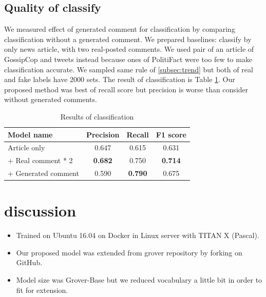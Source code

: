 \documentclass[conference]{IEEEtran}
\begin{document}
\subsection{Quality of classify}
We measured effect of generated comment for classification by comparing classification without a generated comment.
We prepared baselines: classify by only news article, with two real-posted comments.
We used pair of an article of GossipCop and tweets instead because ones of PolitiFact were too few to make classification accurate.
We sampled same rule of \ref{subsec:trend} but both of real and fake labels have 2000 sets.
The result of classification is Table \ref{fig:classify_results}.
Our proposed method was best of recall score but precision is worse than consider without generated comments.
\begin{table}[!t]
    \renewcommand{\arraystretch}{1.3}
    \caption{Results of classification}
    \label{fig:classify_results}
    \centering
    \begin{tabular}{lccc}
    \hline
    Model name           & Precision & Recall & F1 score \\ \hline
    Article only         & 0.647     & 0.615  & 0.631    \\
     + Real comment * 2  & \textbf{0.682}     & 0.750  & \textbf{0.714}    \\
     + Generated comment & 0.590     & \textbf{0.790}  & 0.675    \\ \hline
    \end{tabular}
    \end{table}
\section{discussion}
\label{app:settings}
\begin{itemize}[]
    \item Trained on Ubuntu 16.04 on Docker in Linux server with TITAN X (Pascal).
    \item Our proposed model was extended from grover repository by forking on GitHub.
    \item Model size was Grover-Base but we reduced vocabulary a little bit in order to fit for extension.
\end{itemize}


\end{document}
